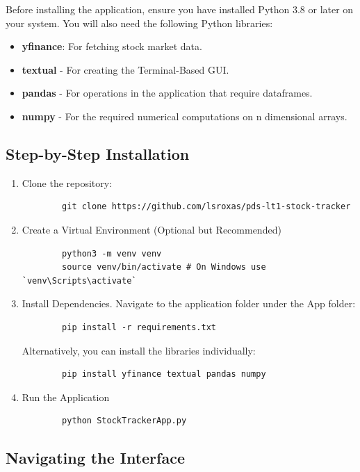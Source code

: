 \documentclass{article}
\begin{document}
Before installing the application, ensure you have installed Python 3.8 or later on your system. You will also need the following Python libraries:
\begin{itemize}
    \item \textbf{yfinance}: For fetching stock market data.
    \item \textbf{textual} - For creating the Terminal-Based GUI.
    \item \textbf{pandas}  - For operations in the application that require dataframes.
    \item \textbf{numpy} - For the required numerical computations on n dimensional arrays.
\end{itemize}


\subsection{Step-by-Step Installation}

\begin{enumerate}
    \item Clone the repository:
    \begin{lstlisting}
        git clone https://github.com/lsroxas/pds-lt1-stock-tracker
    \end{lstlisting}
    \item Create a Virtual Environment (Optional but Recommended)
    \begin{lstlisting}
        python3 -m venv venv
        source venv/bin/activate # On Windows use `venv\Scripts\activate`
    \end{lstlisting}
    \item Install Dependencies. Navigate to the application folder under the App folder:
    \begin{lstlisting}
        pip install -r requirements.txt
    \end{lstlisting}
    Alternatively, you can install the libraries individually:
    \begin{lstlisting}
        pip install yfinance textual pandas numpy
    \end{lstlisting}
    \item Run the Application
    \begin{lstlisting}
        python StockTrackerApp.py
    \end{lstlisting}
\end{enumerate}

\subsection{Navigating the Interface}
\end{document}
